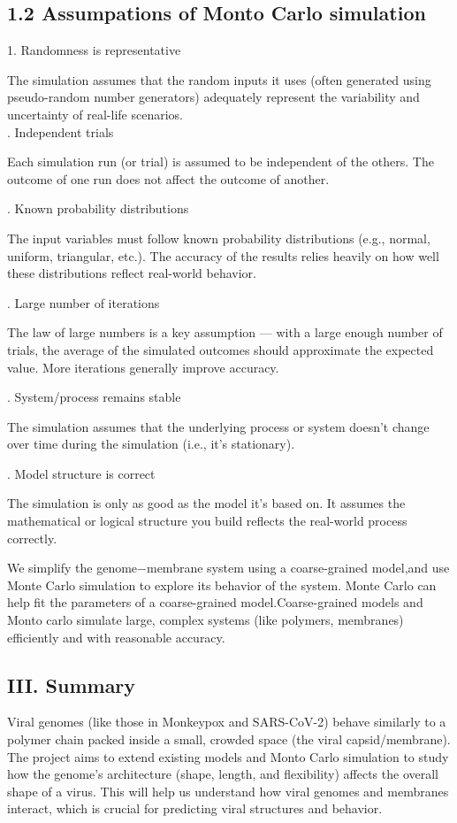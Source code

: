 \documentclass[12pt]{article}
\begin{document}
\begin{flushleft}
\subsection*{1.2 Assumpations of Monto Carlo simulation}


    1. Randomness is representative
    
The simulation assumes that the random inputs it uses (often generated using pseudo-random number generators) adequately represent the variability and uncertainty of real-life scenarios.\\

. Independent trials
    
Each simulation run (or trial) is assumed to be independent of the others. The outcome of one run does not affect the outcome of another.

. Known probability distributions
    
The input variables must follow known probability distributions (e.g., normal, uniform, triangular, etc.). The accuracy of the results relies heavily on how well these distributions reflect real-world behavior.

. Large number of iterations
    
The law of large numbers is a key assumption — with a large enough number of trials, the average of the simulated outcomes should approximate the expected value. More iterations generally improve accuracy.

. System/process remains stable
    
The simulation assumes that the underlying process or system doesn’t change over time during the simulation (i.e., it's stationary).

. Model structure is correct

The simulation is only as good as the model it's based on. It assumes the mathematical or logical structure you build reflects the real-world process correctly.


We simplify the genome$-$membrane system using a coarse-grained model,and use Monte Carlo simulation to explore its behavior of the system. Monte Carlo can help fit the parameters of a coarse-grained model.Coarse-grained models and Monto carlo simulate large, complex systems (like polymers, membranes) efficiently and with reasonable accuracy.




\subsection*{III. Summary}
Viral genomes (like those in Monkeypox and SARS-CoV-2) behave similarly to a polymer chain packed inside a small, crowded space (the viral capsid/membrane). The project aims to extend existing models and Monto Carlo simulation to study how the genome's architecture (shape, length, and flexibility) affects the overall shape of a virus. This will help us understand how viral genomes and membranes interact, which is crucial for predicting viral structures and behavior.




\end{flushleft}
\end{document}

